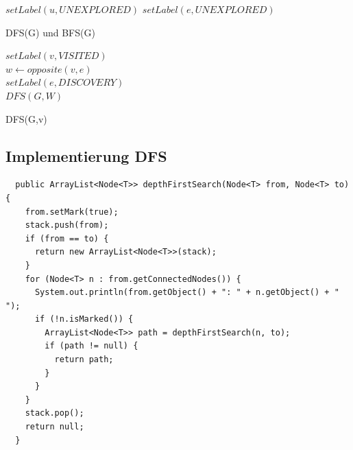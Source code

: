 \begin{algorithm}[h!]
	{
		$setLabel(u, UNEXPLORED)$
	}
	{
		$setLabel(e, UNEXPLORED)$		
	}
	\caption{DFS(G) und BFS(G)}
\end{algorithm}

\clearpage
\begin{algorithm}[h!]
	$setLabel(v, VISITED)$ \\
	{
		 {
			$w \leftarrow opposite(v,e)$ \\
			 {
				$setLabel(e, DISCOVERY)$ \\
				$DFS(G,W)$
			}
		}
	}
	\caption{DFS(G,v)}
\end{algorithm}

\subsection{Implementierung DFS}
\begin{lstlisting}
  public ArrayList<Node<T>> depthFirstSearch(Node<T> from, Node<T> to) {
    from.setMark(true);
    stack.push(from);
    if (from == to) {
      return new ArrayList<Node<T>>(stack);
    }
    for (Node<T> n : from.getConnectedNodes()) {
      System.out.println(from.getObject() + ": " + n.getObject() + " ");
      if (!n.isMarked()) {
        ArrayList<Node<T>> path = depthFirstSearch(n, to);
        if (path != null) {
          return path;
        }
      }
    }
    stack.pop();
    return null;
  }
\end{lstlisting}

\clearpage

